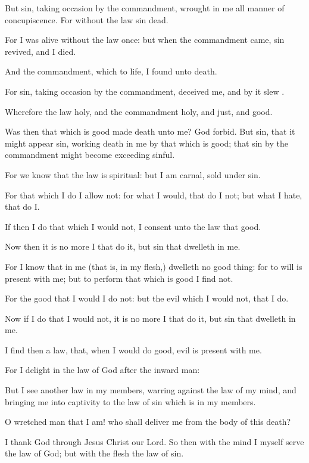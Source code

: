 {But
sin,
taking
occasion
by the
commandment,
wrought
in
me all manner
of
concupiscence.
For
without the
law
sin
{}
dead.

For
I was
alive
without the
law
once:
but
when the
commandment
came,
sin
revived,
and
I
died.

And the
commandment,
which
{}
to
life,
I
found
{}
unto
death.

For
sin,
taking
occasion
by the
commandment,
deceived
me,
and
by
it
slew
{}.

Wherefore the
law
{}
holy,
and the
commandment
holy,
and
just,
and
good.

Was
then that which is
good
made
death unto
me? God
forbid.
But
sin,
that it might
appear
sin,
working
death in
me
by that which is
good;
that
sin
by the
commandment might
become
exceeding
sinful.

For we
know
that the
law
is
spiritual:
but
I
am
carnal,
sold
under
sin.

For that
which I
do I
allow
not:
for
what I
would,
that do
I
not;
but
what I
hate,
that do
I.

If
then I
do that
which I
would
not, I consent
unto the
law
that
{}
good.

Now
then it is no
more
I
that
do
it,
but
sin that
dwelleth
in
me.

For I
know
that
in
me (that
is,
in
my
flesh,)
dwelleth
no good
thing:
for to
will is
present with
me;
but
{} to
perform that which is
good I
find
not.

For the
good
that I
would I
do
not:
but the
evil
which I
would
not,
that I
do.

Now
if I
do
that
I
would
not, it is no
more
I
that
do
it,
but
sin that
dwelleth
in
me.

I
find
then a
law,
that,
when
I
would
do
good,
evil is
present with
me.

For I
delight in the
law of
God
after
the
inward
man:

But I
see
another
law
in
my
members, warring
against the
law
of
my
mind,
and
bringing
me into
captivity to the
law of
sin which
is
in
my
members.

O
wretched
man that I
am!
who shall
deliver
me
from the
body
of
this
death?

I
thank
God
through
Jesus
Christ
our
Lord.
So
then with the
mind
I
myself
serve the
law of
God;
but with the
flesh the
law of
sin.




}
